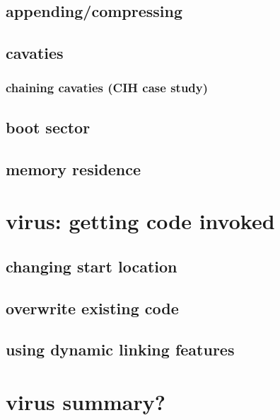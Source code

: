

\subsection{appending/compressing}





\subsection{cavaties}




\subsubsection{chaining cavaties (CIH case study)}



\subsection{boot sector}



\subsection{memory residence}


\section{virus: getting code invoked}



\subsection{changing start location}



\subsection{overwrite existing code}



\subsection{using dynamic linking features}



\section{virus summary?}


